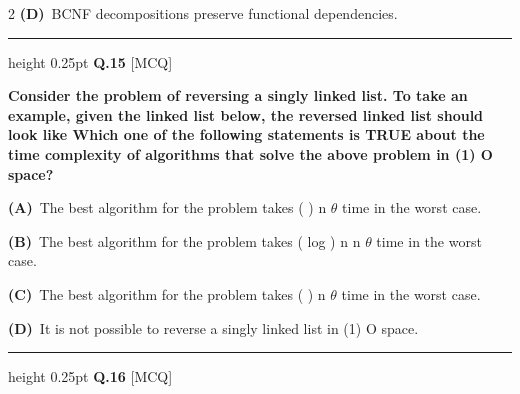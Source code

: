 \documentclass[a4paper,10pt,twoside]{article}
\begin{document}
\begin{multicols}{2}
\textbf{(D)}~BCNF decompositions preserve functional dependencies.
\par\vspace{6pt}\hrule height 0.25pt\vspace{6pt}
\noindent\textbf{Q.15} \hfill {\footnotesize\textsf{[MCQ]}}
\par\vspace{2pt}
{\bfseries Consider the problem of reversing a singly linked list. To take an example, given
the linked list below,
the reversed linked list should look like
Which one of the following statements is TRUE about the time complexity of
algorithms that solve the above problem in
(1)
O
space? \par}
\par\vspace{2pt}\noindent
\textbf{(A)}~The best algorithm for the problem takes ( ) \newline n \newline $\theta$ \newline time in the worst case.\par\vspace{2pt}\noindent
\textbf{(B)}~The best algorithm for the problem takes ( log ) \newline n \newline n \newline $\theta$ \newline time in the worst case.\par\vspace{2pt}\noindent
\textbf{(C)}~The best algorithm for the problem takes  \newline ( \newline ) \newline n \newline $\theta$ \newline time in the worst case.\par\vspace{2pt}\noindent
\textbf{(D)}~It is not possible to reverse a singly linked list in \newline (1) \newline O \newline space.
\par\vspace{6pt}\hrule height 0.25pt\vspace{6pt}
\noindent\textbf{Q.16} \hfill {\footnotesize\textsf{[MCQ]}}
\par\vspace{2pt}

\end{multicols}
\end{document}
